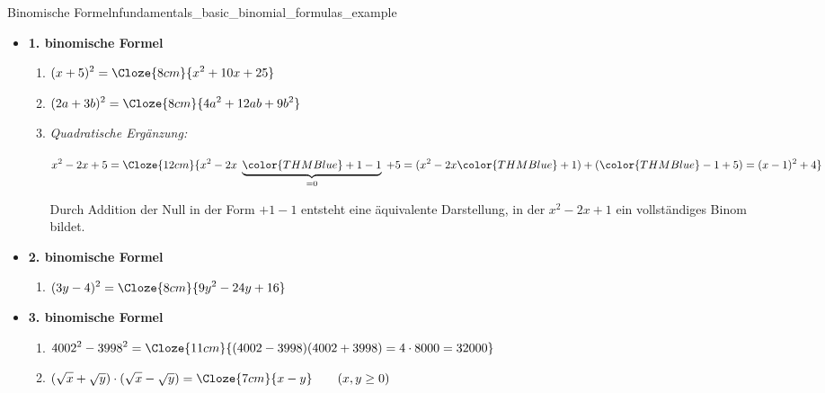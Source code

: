 \noindent\begin{minipage}{\linewidth}
\begin{ExampleBox}{Binomische Formeln}{fundamentals_basic_binomial_formulas_example}
  \begin{itemize}[leftmargin=*,itemsep=1em]
    \item \textbf{1. binomische Formel}
      \begin{enumerate}[
        label=\alph*),leftmargin=*,itemsep=0.65em,series=binomial_examples]
        \item $\displaystyle (x+5)^2
          =\Cloze{8cm}{x^2+10x+25}$
        \item $\displaystyle (2a+3b)^2
          =\Cloze{8cm}{4a^2+12ab+9b^2}$
        \item \emph{Quadratische Ergänzung:}
          \par\smallskip\noindent
          $\displaystyle
            x^2-2x+5=
            \Cloze{12cm}{%
              x^2-2x\;
              \underbrace{{\color{THMBlue}+1-1}}_{=0}\;+5
              =(x^2-2x{\color{THMBlue}+1})
              +({\color{THMBlue}-1}+5)
              =(x-1)^2+4}
          $
          \par\smallskip
          Durch Addition der Null in der Form $+1-1$ entsteht eine äquivalente
          Darstellung, in der $x^2-2x+1$ ein vollständiges Binom bildet.
      \end{enumerate}

    \item \textbf{2. binomische Formel}
      \begin{enumerate}[
        label=\alph*),leftmargin=*,itemsep=0.65em,resume=binomial_examples]
        \item $\displaystyle (3y-4)^2
          =\Cloze{8cm}{9y^2-24y+16}$
      \end{enumerate}

    \item \textbf{3. binomische Formel}
      \begin{enumerate}[
        label=\alph*),leftmargin=*,itemsep=0.65em,resume=binomial_examples]
        \item $\displaystyle 4002^2-3998^2
          =\Cloze{11cm}{(4002-3998)(4002+3998)=4\cdot8000=32000}$
        \item $\displaystyle
          (\sqrt{x}+\sqrt{y})\cdot(\sqrt{x}-\sqrt{y})
          =\Cloze{7cm}{x-y}\qquad(x,y\geq0)$
      \end{enumerate}
  \end{itemize}
\end{ExampleBox}
\end{minipage}
